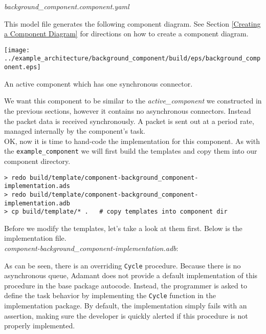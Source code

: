 \textit{background\_component.component.yaml}

This model file generates the following component diagram. See Section \ref{Creating a Component Diagram} for directions on how to create a component diagram.

\vspace{5mm} %
\texttt{[image: ../example\_architecture/background\_component/build/eps/background\_component.eps]}
\caption{An active component which has one synchronous connector.}
\vspace{5mm} %

We want this component to be similar to the \textit{active\_component} we constructed in the previous sections, however it contains no asynchronous connectors. Instead the packet data is received synchronously. A packet is sent out at a period rate, managed internally by the component's task. \\

OK, now it is time to hand-code the implementation for this component. As with the \texttt{example\_component} we will first build the templates and copy them into our component directory.

\vspace{5mm} %
\begin{verbatim}
> redo build/template/component-background_component-implementation.ads 
> redo build/template/component-background_component-implementation.adb 
> cp build/template/* .   # copy templates into component dir
\end{verbatim}
\vspace{5mm} %

Before we modify the templates, let's take a look at them first. Below is the implementation file. \\

\textit{component-background\_component-implementation.adb}:

As can be seen, there is an overriding \texttt{Cycle} procedure. Because there is no asynchronous queue, Adamant does not provide a default implementation of this procedure in the base package autocode. Instead, the programmer is asked to define the task behavior by implementing the \texttt{Cycle} function in the implementation package. By default, the implementation simply fails with an assertion, making sure the developer is quickly alerted if this procedure is not properly implemented. \\

